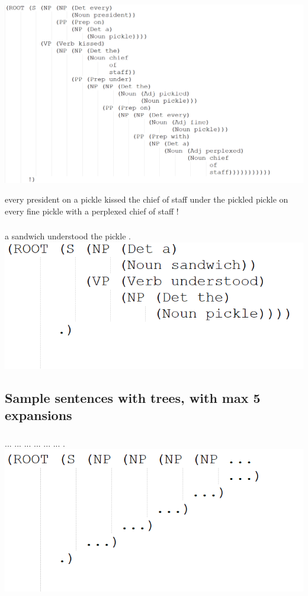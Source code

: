 \documentclass[11pt]{article}
\begin{document}
\includegraphics{tree1.png}

\noindent every president on a pickle kissed the chief of staff under the pickled pickle on every fine pickle with a perplexed chief of staff !

\subsubsection{}

\noindent a sandwich understood the pickle .
\medskip
\includegraphics{tree2.png}

\subsection{Sample sentences with trees, with max 5 expansions}
\subsubsection{}

\noindent ... ... ... ... ... ... .
\medskip
\includegraphics{tree3.png}
\end{document}
